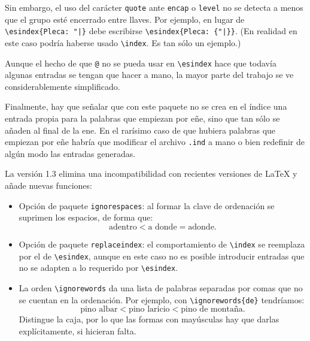 \documentclass[a4paper]{ltxguide}
\begin{document}
Sin embargo, el uso del carácter \verb|quote| ante \verb|encap| o
\verb|level| no se detecta a menos que el grupo esté encerrado entre
llaves. Por ejemplo, en lugar de \verb/\esindex{Pleca: "|}/ debe
escribirse \verb/\esindex{Pleca: {"|}}/. (En realidad en este caso
podría haberse usado \verb|\index|. Es tan sólo un ejemplo.)

Aunque el hecho de que \verb|@| no se pueda usar en \verb|\esindex|
hace que todavía algunas entradas se tengan que hacer a mano, la mayor
parte del trabajo se ve considerablemente simplificado.

Finalmente, hay que señalar que con este paquete no se crea en el
índice una entrada propia para la palabras que empiezan por eñe, sino
que tan sólo se añaden al final de la ene. En el rarísimo caso de que
hubiera palabras que empiezan por eñe habría que modificar el archivo
\verb|.ind| a mano o bien redefinir de algún modo las entradas
generadas.

La versión 1.3 elimina una incompatibilidad con recientes versiones de
\LaTeX{} y añade nuevas funciones:
\begin{itemize}
\item Opción de paquete \verb|ignorespaces|: al formar la clave de 
ordenación se suprimen los espacios, de forma que:
$$\mbox{adentro} < \mbox{a donde} = \mbox{adonde}.$$
\item Opción de paquete \verb|replaceindex|: el comportamiento de
\verb|\index| se reemplaza por el de \verb|\esindex|, aunque en este
caso no es posible introducir entradas que no se adapten a lo
requerido por \verb|\esindex|.
\item La orden \verb|\ignorewords| da
una lista de palabras separadas por comas que no se cuentan en la
ordenación.  Por ejemplo, con \verb|\ignorewords{de}| tendríamos:
$$\mbox{pino albar} < \mbox{pino laricio} < \mbox{pino de montaña}.$$
Distingue la caja, por lo que las formas con mayúsculas hay que darlas
explícitamente, si hicieran falta.
\end{itemize}
\end{document}
